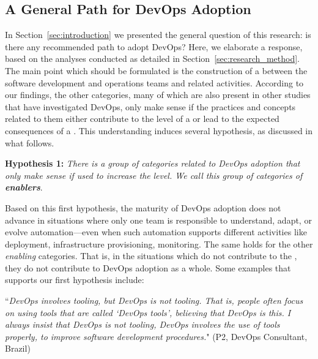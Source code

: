 \subsection{A General Path for DevOps Adoption}

In Section~\ref{sec:introduction} we presented the general question of this
research: is there any recommended path to adopt DevOps? Here, we elaborate a response,
based on the analyses conducted as detailed in Section~\ref{sec:research_method}. The main
point which should be formulated is the construction of a  between the software development and operations teams and
related activities. According to our findings, the other categories,
many of which are also present in other studies that have investigated DevOps,
only make sense if the practices and
concepts related to them either contribute to the level of a \cc or lead to the expected consequences
of a \cc. This understanding induces several hypothesis, as discussed in
what follows.

\begin{mh}
\textbf{Hypothesis 1:} \textit{There is a group of categories related to DevOps adoption
that only make sense if used to increase the} \cc \emph{level. We
call this group of categories of \textbf{enablers}}.
\end{mh}

Based on this first hypothesis, the maturity of DevOps adoption does not
advance in situations where only one team is responsible to understand, adapt, or
evolve automation---even when such automation supports different activities like deployment, infrastructure provisioning,
monitoring. The same holds for the other \emph{enabling} categories. That is, in the situations which
 do not contribute to
the \cc, they do not contribute to DevOps adoption as a whole. Some examples
that supports our first hypothesis include:



\begin{mq}
``\emph{DevOps involves tooling, but DevOps is not tooling. That is, people often
focus on using tools that are called `DevOps tools', believing that DevOps is
this. I always insist that DevOps is not tooling, DevOps involves the use of
tools properly, to improve software development procedures.}" (P2, DevOps
Consultant, Brazil)
\end{mq}


